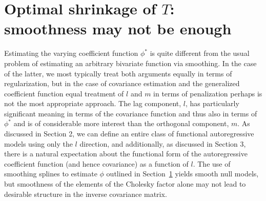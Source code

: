 \documentclass[12pt]{article}
\theoremstyle{definition}
\begin{document}
\section{ Optimal shrinkage of $T$: smoothness may not be enough }

Estimating the varying coefficient function $\phi^*$ is quite different from the usual problem of estimating an arbitrary bivariate function via smoothing. In the case of the latter, we most typically treat both arguments equally in terms of regularization, but in the case of covariance estimation and the generalized coefficient function equal treatment of $l$ and $m$ in terms of penalization perhaps is not the most appropriate approach. The lag component, $l$, has particularly significant meaning in terms of the covariance function and thus also in terms of $\phi^*$ and is of considerable more interest than the orthogonal component, $m$. As discussed in Section 2, we can define an entire class of functional autoregressive models using only the $l$ direction, and additionally, as discussed in Section 3, there is a natural expectation about the functional form of the autoregressive coefficient function (and hence covariance) as a function of $l$. The use of smoothing splines to estimate $\phi$ outlined in Section~\ref{} yields smooth null models, but smoothness of the elements of the Cholesky factor alone may not lead to desirable structure in the inverse covariance matrix.  
\end{document}
